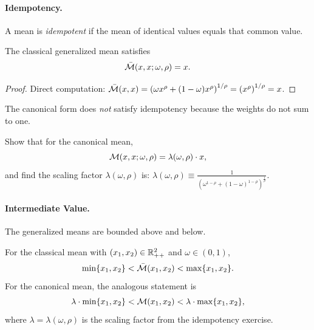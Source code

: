 \paragraph{Idempotency.}

A mean is \emph{idempotent} if the mean of identical values equals that common value.

\begin{proposition}
\label{prop:idempotency-classical}
The classical generalized mean satisfies
\begin{equation}
\bar{\mathcal{M}}(x, x; \omega, \rho) = x.
\end{equation}
\end{proposition}

\begin{proof}
Direct computation: $\bar{\mathcal{M}}(x,x) = \left( \omega x^\rho + (1-\omega) x^\rho \right)^{1/\rho} = \left( x^\rho \right)^{1/\rho} = x$.
\end{proof}

The canonical form does \emph{not} satisfy idempotency because the weights do not sum to one.

\begin{callouttip}[Exercise]
Show that for the canonical mean,
\[
\mathcal{M}(x, x; \omega, \rho) = \lambda(\omega, \rho) \cdot x,
\]
and find the scaling factor $\lambda(\omega, \rho)$ is:
$\lambda(\omega, \rho)\equiv\frac{1}{\left( \omega^{1-\rho} + (1-\omega)^{1-\rho}  \right)^{\frac{1}{\rho}}}$.
\end{callouttip}

\paragraph{Intermediate Value.} The generalized means are bounded above and below. 

\begin{proposition}
\label{prop:bounds}
For the classical mean with $(x_1, x_2) \in \mathbb{R}_{++}^2$ and $\omega \in (0,1)$,
\begin{equation}
\min\{x_1, x_2\} < \bar{\mathcal{M}}(x_1, x_2) < \max\{x_1, x_2\}.
\end{equation}
For the canonical mean, the analogous statement is
\begin{equation}
\lambda \cdot \min\{x_1, x_2\} < \mathcal{M}(x_1, x_2) < \lambda \cdot \max\{x_1, x_2\},
\end{equation}
where $\lambda = \lambda(\omega, \rho)$ is the scaling factor from the idempotency exercise.
\end{proposition}

